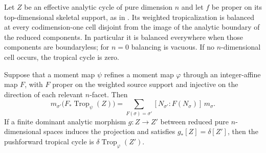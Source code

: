 \begin{theorem}\label{thm:analytic-tropical-balancing}
Let $Z$ be an effective analytic cycle of pure dimension $n$ and let $f$ be
proper on its top-dimensional skeletal support, as in
. Its weighted tropicalization is balanced
at every codimension-one cell disjoint from the image of the analytic
boundary of the reduced components. In particular it is balanced everywhere
when those components are boundaryless; for $n=0$ balancing is vacuous.
If no $n$-dimensional cell occurs, the tropical cycle is zero.

Suppose that a moment map $\psi$ refines a moment map $\varphi$ through an
integer-affine map $F$, with $F$ proper on the weighted source support and
injective on the direction of each relevant $n$-facet. Then
\begin{equation}\label{eq:analytic-tropical-pushforward}
 m_{\sigma'}\bigl(F_*\operatorname{Trop}_{\psi}(Z)\bigr)
 =\sum_{F(\sigma)=\sigma'}
   [N_{\sigma'}:F(N_\sigma)]\,m_\sigma.
\end{equation}
If a finite dominant analytic morphism $g:Z\to Z'$ between reduced pure
$n$-dimensional spaces induces the projection and satisfies
$g_*[Z]=\delta[Z']$, then the pushforward tropical cycle is
$\delta\operatorname{Trop}_{\varphi}(Z')$.
\end{theorem}
